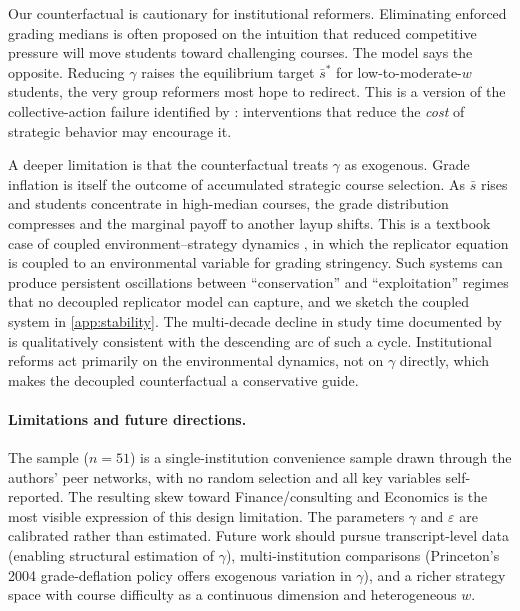 \documentclass[12pt]{article}
\begin{document}
Our counterfactual is cautionary for institutional reformers.
Eliminating enforced grading medians is often proposed on the
intuition that reduced competitive pressure will move students toward
challenging courses. The model says the opposite. Reducing $\gamma$
raises the equilibrium target $\bar s^\ast$ for low-to-moderate-$w$
students, the very group reformers most hope to redirect. This is a
version of the collective-action failure identified by
\textcite{bok2006underachieving}: interventions that reduce the
\emph{cost} of strategic behavior may encourage it.

A deeper limitation is that the counterfactual treats $\gamma$ as
exogenous. Grade inflation is itself the outcome of accumulated
strategic course selection. As $\bar s$ rises and students
concentrate in high-median courses, the grade distribution compresses
and the marginal payoff to another layup shifts. This is a textbook
case of coupled environment--strategy dynamics
\parencite{weitz2016oscillating, tilman2020evolutionary}, in which the
replicator equation is coupled to an environmental variable for grading
stringency. Such systems can produce persistent oscillations between
``conservation'' and ``exploitation'' regimes that no decoupled
replicator model can capture, and we sketch the coupled system in
\ref{app:stability}. The multi-decade decline in study time
documented by \textcite{babcock2011falling} is qualitatively consistent
with the descending arc of such a cycle. Institutional reforms act
primarily on the environmental dynamics, not on $\gamma$ directly, which
makes the decoupled counterfactual a conservative guide.

\paragraph{Limitations and future directions.}
The sample ($n = 51$) is a single-institution convenience sample
drawn through the authors' peer networks, with no random selection
and all key variables self-reported. The resulting skew toward
Finance/consulting and Economics is the most visible expression of
this design limitation. The parameters $\gamma$ and $\varepsilon$ are
calibrated rather than estimated. Future work should pursue
transcript-level data (enabling structural estimation of $\gamma$),
multi-institution comparisons (Princeton's 2004 grade-deflation
policy offers exogenous variation in $\gamma$), and a richer strategy
space with course difficulty as a continuous dimension and
heterogeneous $w$.
\end{document}
